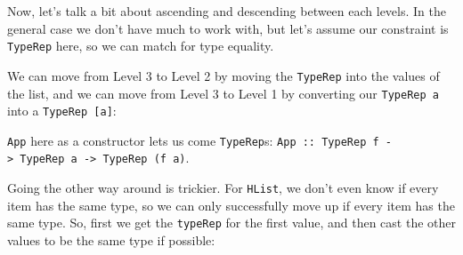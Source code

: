 \documentclass[]{article}
\newenvironment{Shaded}{}{}
\newcommand{\CommentTok}[1]{\textcolor[rgb]{0.38,0.63,0.69}{\textit{#1}}}
\newcommand{\DataTypeTok}[1]{\textcolor[rgb]{0.56,0.13,0.00}{#1}}
\newcommand{\FunctionTok}[1]{\textcolor[rgb]{0.02,0.16,0.49}{#1}}
\newcommand{\KeywordTok}[1]{\textcolor[rgb]{0.00,0.44,0.13}{\textbf{#1}}}
\newcommand{\NormalTok}[1]{#1}
\newcommand{\OperatorTok}[1]{\textcolor[rgb]{0.40,0.40,0.40}{#1}}
\newcommand{\OtherTok}[1]{\textcolor[rgb]{0.00,0.44,0.13}{#1}}
\begin{document}
Now, let's talk a bit about ascending and descending between each levels. In the
general case we don't have much to work with, but let's assume our constraint is
\texttt{TypeRep} here, so we can match for type equality.

We can move from Level 3 to Level 2 by moving the \texttt{TypeRep} into the
values of the list, and we can move from Level 3 to Level 1 by converting our
\texttt{TypeRep\ a} into a \texttt{TypeRep\ {[}a{]}}:

\begin{Shaded}
\end{Shaded}

\texttt{App} here as a constructor lets us come \texttt{TypeRep}s:
\texttt{App\ ::\ TypeRep\ f\ -\textgreater{}\ TypeRep\ a\ -\textgreater{}\ TypeRep\ (f\ a)}.

Going the other way around is trickier. For \texttt{HList}, we don't even know
if every item has the same type, so we can only successfully move up if every
item has the same type. So, first we get the \texttt{typeRep} for the first
value, and then cast the other values to be the same type if possible:

\begin{Shaded}
\end{Shaded}
\end{document}
